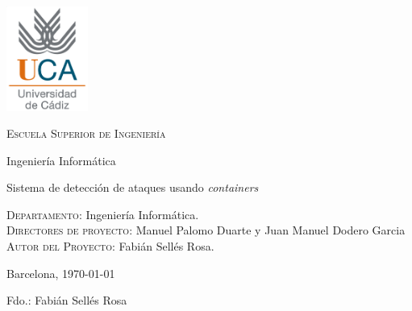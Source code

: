 \thispagestyle{empty}

\includegraphics[width=0.2\textwidth]{images/logouca}

\bigskip
\bigskip
\bigskip
  
  \begin{changemargin}{3em}{3em}

    \begin{center}
      {\Huge \textsc{\nohyphens{Escuela Superior de Ingeniería}}}
      
      \bigskip
      \bigskip
      
      {\huge \nohyphens{Ingeniería Informática}}
      
      \bigskip
      \bigskip
      \bigskip
      \bigskip
      
      {\LARGE \nohyphens{Sistema de detección de ataques usando  \emph{containers}}}
      
      \bigskip
      \bigskip
      \bigskip
      \bigskip
      
    \end{center}
  \end{changemargin}

  \begin{flushleft}
    \Large

    \textsc{Departamento}: \nohyphens{Ingeniería Informática.} \\
    \textsc{Directores de proyecto}: \nohyphens{Manuel Palomo Duarte y Juan Manuel Dodero Garcia} \\
    \textsc{Autor del Proyecto}: \nohyphens{Fabián Sellés Rosa}. \\
  \end{flushleft}
  
  \bigskip
  \bigskip
  \bigskip
  
  \begin{flushright}
    \large
    Barcelona, \today
    
    Fdo.: Fabián Sellés Rosa
    
  \end{flushright}

